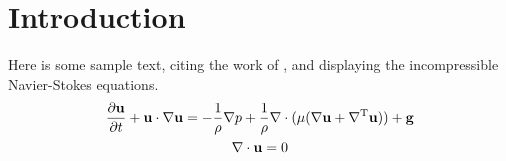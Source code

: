 \documentclass{article}
\author{Z. Jibben}
\date{\today}
\begin{document}
\maketoptitle

\section{Introduction}
Here is some sample text, citing the work of \textcite{Nobody}, and displaying the incompressible Navier-Stokes equations.
\begin{gather}
  \dfrac{\partial \mathbf{u}}{\partial t} + \mathbf{u}\cdot\nabla\mathbf{u} = -\frac{1}{\rho}\nabla p + \frac{1}{\rho}\nabla\cdot(\mu(\nabla\mathbf{u}+\nabla^\mathrm{T}\mathbf{u})) + \mathbf{g}
  \\
  \nabla\cdot\mathbf{u} = 0
\end{gather}


\printbibliography[]
\end{document}
